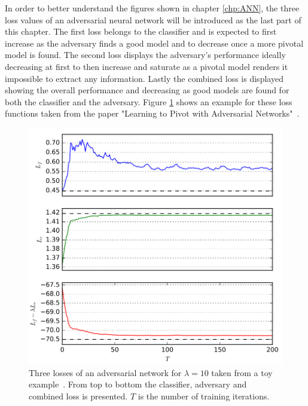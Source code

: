 In order to better understand the figures shown in chapter \ref{chp:ANN}, the three loss values of an adversarial neural network will be introduced as the last part of this chapter.
The first loss belongs to the classifier and is expected to first increase as the adversary finds a good model and to decrease once a more pivotal model is found. 
The second loss displays the adversary's performance ideally decreasing at first to then increase and saturate as a pivotal model renders it impossible to extract any information.
Lastly the combined loss is displayed showing the overall performance and decreasing as good models are found for both the classifier and the adversary.
Figure \ref{fig:losses_paper} shows an example for these loss functions taken from the paper "Learning to Pivot with Adversarial Networks"~\cite{Louppe:2016ylz}.
%
\begin{figure}[htbp]
	\centering
	\includegraphics[width=\textwidth]{figures_ML/losses_paper}
	\caption[Exemplary loss of an adversarial network structure]{Three losses of an adversarial network for $\lambda = 10$ taken from a toy example~\cite{Louppe:2016ylz}. From top to bottom the classifier, adversary and combined loss is presented. $T$ is the number of training iterations.}
	\label{fig:losses_paper}
\end{figure}



